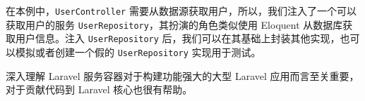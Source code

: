 \documentclass{progartcn}
\begin{document}
在本例中，\verb|UserController| 需要从数据源获取用户，所以，我们注入了一个可以获取用户的服务 \verb|UserRepository|，其扮演的角色类似使用 Eloquent 从数据库获取用户信息。注入 \verb|UserRepository| 后，我们可以在其基础上封装其他实现，也可以模拟或者创建一个假的 \verb|UserRepository| 实现用于测试。

深入理解 Laravel 服务容器对于构建功能强大的大型 Laravel 应用而言至关重要，对于贡献代码到 Laravel 核心也很有帮助。

\end{document}
